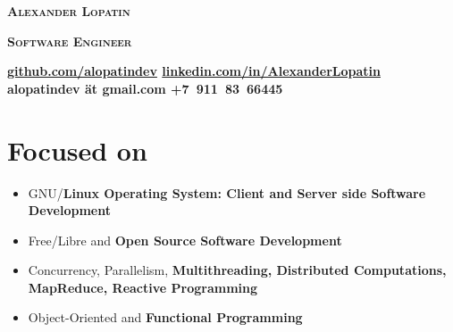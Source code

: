 \begin{center}
\fontsize{23pt}{15pt}\selectfont
\textsc{\lsstyle\bfseries Alexander Lopatin\mdseries}

\vspace{15pt}

\fontsize{18pt}{10pt}\selectfont
\textsc{\bfseries Software Engineer\mdseries}

\vspace{6pt}


\horizline

\vspace{0.1cm}

{
\bfseries
\fontsize{8pt}{8pt}\selectfont
\faGithub\hspace{0.1cm}\href{https://github.com/alopatindev?tab=repositories}{github.com/alopatindev}
\contactDelimiter\faLinkedinSquare\hspace{0.1cm}\href{https://www.linkedin.com/in/AlexanderLopatin}{linkedin.com/in/AlexanderLopatin}
\contactDelimiter\faEnvelope\hspace{0.1cm}alopatindev ät gmail.com
\contactDelimiter\faMobilePhone\hspace{0.1cm}+7~911~83~66445
\mdseries
}

\end{center}

\fontsize{11pt}{12pt}\selectfont

\section*{Focused on}

\begin{itemize}[rightmargin=\dimexpr\linewidth-18cm-\leftmargin\relax]
\item GNU/\bfseries Linux \mdseries Operating System: \bfseries Client \mdseries and Server side Software Development
\item Free/Libre and \bfseries Open Source \mdseries Software Development
\item Concurrency, Parallelism, \bfseries Multithreading\mdseries, Distributed Computations, MapReduce, \bfseries Reactive \mdseries Programming
\item Object-Oriented and \bfseries Functional \mdseries Programming
\end{itemize}

